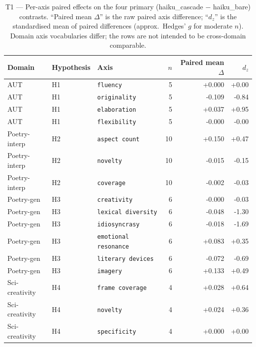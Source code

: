 \begin{table}[ht]
\centering
\caption{T1 --- Per-axis paired effects on the four primary (haiku\_cascade $-$ haiku\_bare) contrasts. ``Paired mean $\Delta$'' is the raw paired axis difference; ``$d_z$'' is the standardised mean of paired differences (approx.\ Hedges' $g$ for moderate $n$). Domain axis vocabularies differ; the rows are not intended to be cross-domain comparable.}
\label{tab:per_axis_effects}
\begin{tabular}{lllrrr}
\toprule
Domain & Hypothesis & Axis & $n$ & Paired mean $\Delta$ & $d_z$ \\
\midrule
  AUT & H1 & \texttt{fluency} & 5 & +0.000 & +0.00 \\
  AUT & H1 & \texttt{originality} & 5 & -0.109 & -0.84 \\
  AUT & H1 & \texttt{elaboration} & 5 & +0.037 & +0.95 \\
  AUT & H1 & \texttt{flexibility} & 5 & -0.000 & -0.00 \\
  Poetry-interp & H2 & \texttt{aspect count} & 10 & +0.150 & +0.47 \\
  Poetry-interp & H2 & \texttt{novelty} & 10 & -0.015 & -0.15 \\
  Poetry-interp & H2 & \texttt{coverage} & 10 & -0.002 & -0.03 \\
  Poetry-gen & H3 & \texttt{creativity} & 6 & -0.000 & -0.03 \\
  Poetry-gen & H3 & \texttt{lexical diversity} & 6 & -0.048 & -1.30 \\
  Poetry-gen & H3 & \texttt{idiosyncrasy} & 6 & -0.018 & -1.69 \\
  Poetry-gen & H3 & \texttt{emotional resonance} & 6 & +0.083 & +0.35 \\
  Poetry-gen & H3 & \texttt{literary devices} & 6 & -0.072 & -0.69 \\
  Poetry-gen & H3 & \texttt{imagery} & 6 & +0.133 & +0.49 \\
  Sci-creativity & H4 & \texttt{frame coverage} & 4 & +0.028 & +0.64 \\
  Sci-creativity & H4 & \texttt{novelty} & 4 & +0.024 & +0.36 \\
  Sci-creativity & H4 & \texttt{specificity} & 4 & +0.000 & +0.00 \\
\bottomrule
\end{tabular}
\end{table}

